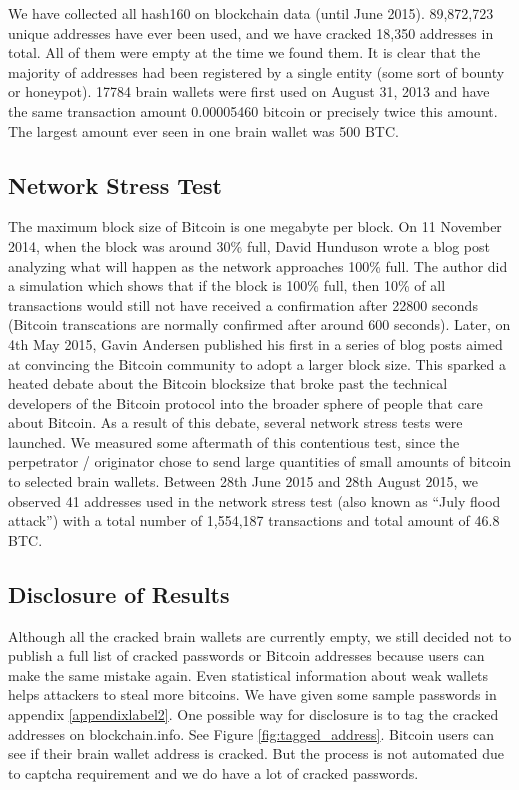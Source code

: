 We have collected all hash160 on blockchain data (until June 2015). 89,872,723 unique addresses have ever been used, and we have cracked 18,350 addresses in total. All of them were empty at the time we found them. It is clear that the majority of addresses had been registered by a single entity (some sort of bounty or honeypot). 17784 brain wallets were first used on August 31, 2013 and have the same transaction amount 0.00005460 bitcoin or precisely twice this amount. The largest amount ever seen in one brain wallet was 500 BTC. 

\subsection{Network Stress Test}
The maximum block size of Bitcoin is one megabyte per block. On 11 November 2014, when the block was around 30\% full, David Hunduson wrote a blog post \cite{DavidHunduson2015} analyzing what will happen as the network approaches 100\% full. The author did a simulation which shows that if the block is 100\% full, then 10\% of all transactions would still not have received a confirmation after 22800 seconds (Bitcoin transcations are normally confirmed after around 600 seconds).
Later, on 4th May 2015, Gavin Andersen published his first in a series of blog posts \cite{Andersen2015} aimed at convincing the Bitcoin community to adopt a larger block size. This sparked a heated debate about the Bitcoin blocksize that broke past the technical developers of the Bitcoin protocol into the broader sphere of people that care about Bitcoin. As a result of this debate, several network stress tests were launched. We measured some aftermath of this contentious test, since the perpetrator / originator chose to send large quantities of small amounts of bitcoin to selected brain wallets. Between 28th June 2015 and 28th August  2015, we observed 41 addresses used in the network stress test (also known as ``July flood attack'') with a total number of 1,554,187 transactions and total amount of 46.8 BTC.  

\subsection{Disclosure of Results}
Although all the cracked brain wallets are currently empty, we still decided not to publish a full list of cracked passwords or Bitcoin addresses because users can make the same mistake again. Even statistical information about weak wallets helps attackers to steal more bitcoins. We have given some sample passwords in appendix \ref{appendixlabel2}. One possible way for disclosure is to tag the cracked addresses on blockchain.info. See Figure \ref{fig:tagged_address}. Bitcoin users can see if their brain wallet address is cracked. But the process is not automated due to captcha requirement and we do have a lot of cracked passwords.
 
